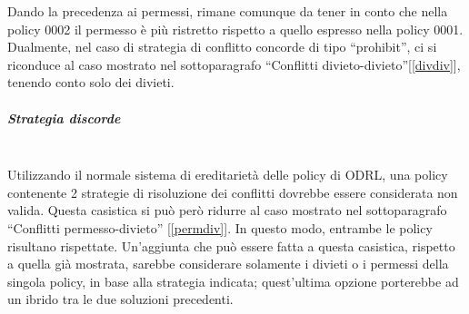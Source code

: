 \documentclass[12pt,a4paper,twoside]{book}
\begin{document}
Dando la precedenza ai permessi, rimane comunque da tener in conto che nella policy 0002 il permesso è più ristretto rispetto a quello espresso nella policy 0001.\\
Dualmente, nel caso di strategia di conflitto concorde di tipo ``prohibit'', ci si riconduce al caso mostrato nel sottoparagrafo ``Conflitti divieto-divieto''[\ref{divdiv}], tenendo conto solo dei divieti.
\subparagraph{Strategia discorde}\mbox{}\\
Utilizzando il normale sistema di ereditarietà delle policy di ODRL, una policy contenente 2 strategie di risoluzione dei conflitti dovrebbe essere considerata non valida. Questa casistica si può però ridurre al caso mostrato nel sottoparagrafo ``Conflitti permesso-divieto'' [\ref{permdiv}]. In questo modo, entrambe le policy risultano rispettate. Un'aggiunta che può essere fatta a questa casistica, rispetto a quella già mostrata, sarebbe considerare solamente i divieti o i permessi della singola policy, in base alla strategia indicata; quest'ultima opzione porterebbe ad un ibrido tra le due soluzioni precedenti.
\end{document}
